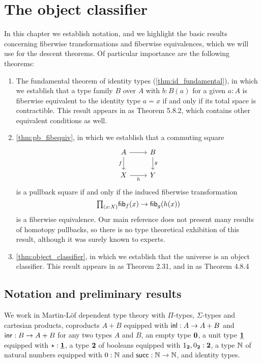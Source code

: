 \chapter{The object classifier}

In this chapter we establish notation, and we highlight the basic results concerning fiberwise transformations and fiberwise equivalences, which we will use for the descent theorems. Of particular importance are the following theorems:
\begin{enumerate}
\item The fundamental theorem of identity types (\cref{thm:id_fundamental}), in which we establish that a type family $B$ over $A$ with $b:B(a)$ for a given $a:A$ is fiberwise equivalent to the identity type $a=x$ if and only if its total space is contractible. This result appears in \cite{hottbook} as Theorem 5.8.2, which contains other equivalent conditions as well.
\item \cref{thm:pb_fibequiv}, in which we establish that a commuting square
\begin{equation*}
\begin{tikzcd}
A \arrow[d,swap,"f"] \arrow[r] & B \arrow[d,"g"] \\
X \arrow[r,swap,"h"] & Y
\end{tikzcd}
\end{equation*}
is a pullback square if and only if the induced fiberwise transformation
\begin{equation*}
\prd{x:X} \fib{f}{x}\to\fib{g}{h(x)}
\end{equation*}
is a fiberwise equivalence. Our main reference \cite{hottbook} does not present many results of homotopy pullbacks, so there is no type theoretical exhibition of this result, although it was surely known to experts.
\item \cref{thm:object_classifier}, in which we establish that the universe is an object classifier. This result appears in \cite{rijkespitters} as Theorem 2.31, and in \cite{hottbook} as Theorem 4.8.4
\end{enumerate}

\section{Notation and preliminary results}

We work in Martin-L\"of dependent type theory with $\Pi$-types, $\Sigma$-types and cartesian products, coproducts $A+B$ equipped with ${\mathsf{inl}}:A\to A+B$ and ${\mathsf{inr}}:B\to A+B$ for any two types $A$ and $B$, an empty type $\mathbf{0}$, a unit type $\underline{\mathbf{1}}$ equipped with $\star:\underline{\mathbf{1}}$, a type $\mathbf{2}$ of booleans equipped with ${1_{\mathbf{2}}},{0_{\mathbf{2}}}:\mathbf{2}$, a type $\mathbb{N}$ of natural numbers equipped with $0:\mathbb{N}$ and $\mathsf{succ}:\mathbb{N}\to\mathbb{N}$, and identity types. 

